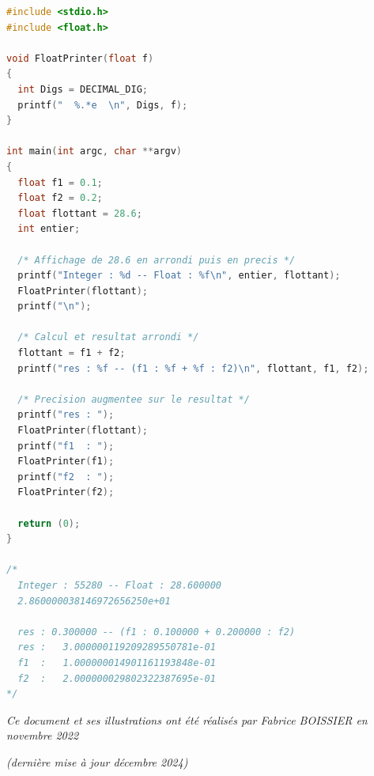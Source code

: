 \documentclass[11pt,a4paper]{article}
\begin{document}
\begin{lstlisting}[language=C]
#include <stdio.h>
#include <float.h>

void FloatPrinter(float f)
{
  int Digs = DECIMAL_DIG;
  printf("  %.*e  \n", Digs, f);
}

int main(int argc, char **argv)
{
  float f1 = 0.1;
  float f2 = 0.2;
  float flottant = 28.6;
  int entier;

  /* Affichage de 28.6 en arrondi puis en precis */
  printf("Integer : %d -- Float : %f\n", entier, flottant);
  FloatPrinter(flottant);
  printf("\n");

  /* Calcul et resultat arrondi */
  flottant = f1 + f2;
  printf("res : %f -- (f1 : %f + %f : f2)\n", flottant, f1, f2);

  /* Precision augmentee sur le resultat */
  printf("res : ");
  FloatPrinter(flottant);
  printf("f1  : ");
  FloatPrinter(f1);
  printf("f2  : ");
  FloatPrinter(f2);

  return (0);
}

/*
  Integer : 55280 -- Float : 28.600000
  2.860000038146972656250e+01

  res : 0.300000 -- (f1 : 0.100000 + 0.200000 : f2)
  res :   3.000000119209289550781e-01
  f1  :   1.000000014901161193848e-01
  f2  :   2.000000029802322387695e-01
*/
\end{lstlisting}

\medskip


%
%

\begin{center}
\textit{Ce document et ses illustrations ont été réalisés par Fabrice BOISSIER en novembre 2022}

\textit{(dernière mise à jour décembre 2024)}
\end{center}
\end{document}
